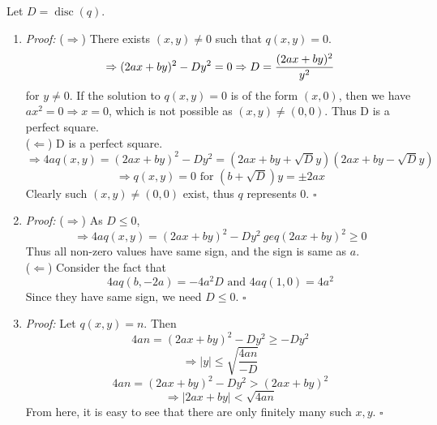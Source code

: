 \documentclass[a4paper,11pt,abstracton]{scrartcl}
\theoremstyle{dotlessP}
\theoremstyle{dotlessS}
\theoremstyle{remark}
\theoremstyle{definition}
\begin{document}
\begin{claim_box}
Let $D = \operatorname{disc}(q)$.

\begin{enumerate}
\item 
\textit{Proof:} ($\Rightarrow$)
There exists $(x,y) \neq 0$ such that $q(x,y)=0$. 
\[
\Rightarrow (2ax+by)^2-Dy^2=0 \\
\Rightarrow D = \frac{(2ax+by)^2}{y^2}
\]
for $y \neq 0$. If the solution to $q(x,y)=0$ is of the form $(x,0)$, then we have $ax^2=0 \Rightarrow x=0$, which is not possible as $(x,y) \neq (0,0)$. Thus D is a perfect square.
\\ ($\Leftarrow$)
D is a perfect square. 
\[
\Rightarrow 4aq(x,y) = (2ax+by)^2 - Dy^2 = (2ax+by+\sqrt{D}y)(2ax+by-\sqrt{D}y) 
\]
\[
\Rightarrow q(x,y) = 0 \text{ for } (b+\sqrt{D})y = \pm 2ax
\]
Clearly such $(x,y) \neq (0,0)$ exist, thus $q$ represents $0$.
\hfill$\square$

\item 
\textit{Proof:} ($\Rightarrow$)
As $D \leq 0$,
\[
\Rightarrow 4aq(x,y) = (2ax+by)^2 - Dy^2 \ geq (2ax+by)^2 \geq 0
\]
Thus all non-zero values have same sign, and the sign is same as $a$.
\\ ($\Leftarrow$)
Consider the fact that
\[
4aq(b,-2a)=-4a^2D \text{ and } 4aq(1,0)=4a^2
\]
Since they have same sign, we need $D \leq 0$.
\hfill$\square$

\item 
\textit{Proof:}
Let $q(x,y)=n$. Then
\[
4an = (2ax+by)^2-Dy^2 \geq -Dy^2
\]
\[
\Rightarrow |y| \leq \sqrt{\frac{4an}{-D}} 
\]
\[
4an = (2ax+by)^2-Dy^2 > (2ax+by)^2
\]
\[
\Rightarrow |2ax+by| < \sqrt{4an}
\]
From here, it is easy to see that there are only finitely many such $x,y$.
\hfill$\square$
\end{enumerate}
\end{claim_box}
\end{document}
